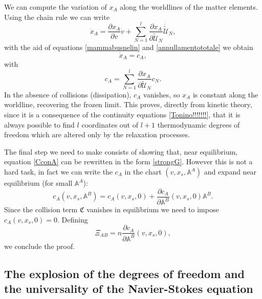 \documentclass[useAMS,usenatbib,prd,twocolumn,nofootinbib]{revtex4-1}
\begin{document}
We can compute the variation of $x_A$ along the worldlines of the matter elements. Using the chain rule we can write
\begin{equation}
\dot{x}_A = \dfrac{\partial x_A}{\partial v} \dot{v} + \sum_{N=1}^l \dfrac{\partial x_A}{\partial \tilde{\mathcal{U}}_N} \dot{\tilde{\mathcal{U}}}_N,
\end{equation}
with the aid of equations \eqref{mammabusnelin} and \eqref{annullamentototale} we obtain
\begin{equation}\label{CconA}
\dot{x}_A = c_A,
\end{equation}
with
\begin{equation}
c_A = \sum_{N=1}^l \dfrac{\partial x_A}{\partial \tilde{\mathcal{U}}_N} c_N.
\end{equation}
In the absence of collisions (dissipation), $c_A$ vanishes, so $x_A$ is constant along the worldline, recovering the frozen limit. This proves, directly from kinetic theory, since it is a consequence of the continuity equations \eqref{Tonino!!!!!!!}, that it is always possible to find $l$ coordinates out of $l+1$ thermodynamic degrees of freedom which are altered only by the relaxation processes.  

The final step we need to make consists of showing that, near equilibrium, equation \eqref{CconA} can be rewritten in the form \eqref{strongG}. However this is not a hard task, in fact we can write the $c_A$ in the chart $(v,x_s,\mathbb{A}^A)$ and expand near equilibrium (for small $\mathbb{A}^A$):
\begin{equation}
c_A(v,x_s,\mathbb{A}^B) =  c_A(v,x_s,0) + \dfrac{\partial c_A}{\partial \mathbb{A}^B}(v,x_s,0) \mathbb{A}^B.
\end{equation}
Since the collision term $\mathfrak{C}$ vanishes in equilibrium we need to impose $c_A(v,x_s,0)=0$. Defining
\begin{equation}
\Xi_{AB}=n \dfrac{\partial c_A}{\partial \mathbb{A}^B}(v,x_s,0),
\end{equation} 
we conclude the proof.

\subsection{The explosion of the degrees of freedom and the universality of the Navier-Stokes equation}\label{explofdegree}

\end{document}
